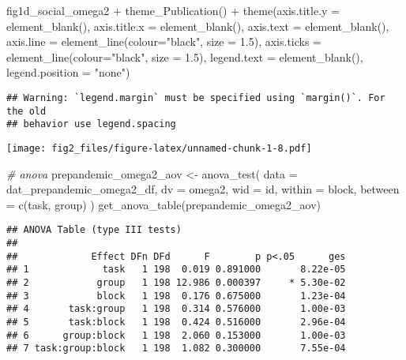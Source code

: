 \documentclass[
]{article}
\newenvironment{Shaded}{\begin{snugshade}}{\end{snugshade}}
\newcommand{\AttributeTok}[1]{\textcolor[rgb]{0.77,0.63,0.00}{#1}}
\newcommand{\CommentTok}[1]{\textcolor[rgb]{0.56,0.35,0.01}{\textit{#1}}}
\newcommand{\FloatTok}[1]{\textcolor[rgb]{0.00,0.00,0.81}{#1}}
\newcommand{\FunctionTok}[1]{\textcolor[rgb]{0.00,0.00,0.00}{#1}}
\newcommand{\NormalTok}[1]{#1}
\newcommand{\OtherTok}[1]{\textcolor[rgb]{0.56,0.35,0.01}{#1}}
\newcommand{\SpecialCharTok}[1]{\textcolor[rgb]{0.00,0.00,0.00}{#1}}
\newcommand{\StringTok}[1]{\textcolor[rgb]{0.31,0.60,0.02}{#1}}
\begin{document}
\begin{Shaded}
\begin{Highlighting}[]
\NormalTok{fig1d\_social\_omega2 }\SpecialCharTok{+} \FunctionTok{theme\_Publication}\NormalTok{() }\SpecialCharTok{+} \FunctionTok{theme}\NormalTok{(}\AttributeTok{axis.title.y =} \FunctionTok{element\_blank}\NormalTok{(),}
                                                  \AttributeTok{axis.title.x =} \FunctionTok{element\_blank}\NormalTok{(),}
                                                  \AttributeTok{axis.text =} \FunctionTok{element\_blank}\NormalTok{(), }
                                                  \AttributeTok{axis.line =} \FunctionTok{element\_line}\NormalTok{(}\AttributeTok{colour=}\StringTok{"black"}\NormalTok{, }\AttributeTok{size =} \FloatTok{1.5}\NormalTok{),}
                                                  \AttributeTok{axis.ticks =} \FunctionTok{element\_line}\NormalTok{(}\AttributeTok{colour=}\StringTok{"black"}\NormalTok{, }\AttributeTok{size =} \FloatTok{1.5}\NormalTok{),}
                                                  \AttributeTok{legend.text =} \FunctionTok{element\_blank}\NormalTok{(),}
                                                  \AttributeTok{legend.position =} \StringTok{"none"}\NormalTok{)}
\end{Highlighting}
\end{Shaded}

\begin{verbatim}
## Warning: `legend.margin` must be specified using `margin()`. For the old
## behavior use legend.spacing
\end{verbatim}

\texttt{[image: fig2\_files/figure-latex/unnamed-chunk-1-8.pdf]}

\begin{Shaded}
\begin{Highlighting}[]
\CommentTok{\# anova}
\NormalTok{prepandemic\_omega2\_aov }\OtherTok{\textless{}{-}} \FunctionTok{anova\_test}\NormalTok{(}
  \AttributeTok{data =}\NormalTok{ dat\_prepandemic\_omega2\_df, }\AttributeTok{dv =}\NormalTok{ omega2, }\AttributeTok{wid =}\NormalTok{ id,}
  \AttributeTok{within =}\NormalTok{ block, }\AttributeTok{between =} \FunctionTok{c}\NormalTok{(task, group)}
\NormalTok{)}
\FunctionTok{get\_anova\_table}\NormalTok{(prepandemic\_omega2\_aov)}
\end{Highlighting}
\end{Shaded}

\begin{verbatim}
## ANOVA Table (type III tests)
## 
##             Effect DFn DFd      F        p p<.05      ges
## 1             task   1 198  0.019 0.891000       8.22e-05
## 2            group   1 198 12.986 0.000397     * 5.30e-02
## 3            block   1 198  0.176 0.675000       1.23e-04
## 4       task:group   1 198  0.314 0.576000       1.00e-03
## 5       task:block   1 198  0.424 0.516000       2.96e-04
## 6      group:block   1 198  2.060 0.153000       1.00e-03
## 7 task:group:block   1 198  1.082 0.300000       7.55e-04
\end{verbatim}
\end{document}
